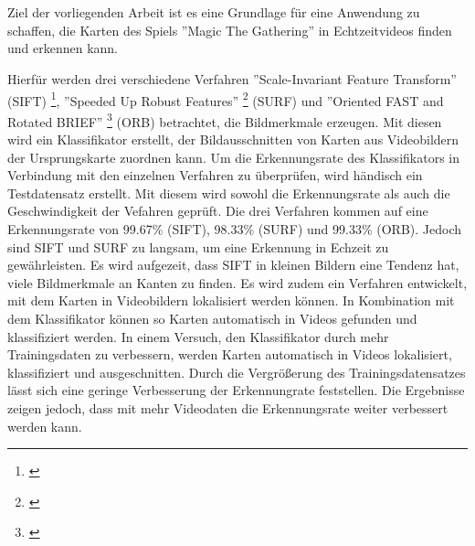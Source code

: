\section*{}
Ziel der vorliegenden Arbeit ist es eine Grundlage für eine Anwendung zu schaffen, die Karten des Spiels ''Magic The Gathering'' in Echtzeitvideos finden und erkennen kann.

Hierfür werden drei verschiedene Verfahren ''Scale-Invariant Feature Transform'' (SIFT) \footnote{\cite{Lowe2004}}, ''Speeded Up Robust Features'' \footnote{\cite{Bay:2008:SRF:1370312.1370556}} (SURF) und ''Oriented FAST and Rotated BRIEF'' \footnote{\cite{Rublee:2011:OEA:2355573.2356268}} (ORB)  betrachtet, die Bildmerkmale erzeugen. Mit diesen wird ein Klassifikator erstellt, der Bildausschnitten von Karten aus Videobildern der Ursprungskarte zuordnen kann.
Um die Erkennungsrate des Klassifikators in Verbindung mit den einzelnen Verfahren zu überprüfen, wird händisch ein Testdatensatz erstellt. Mit diesem wird sowohl die Erkennungsrate als auch die Geschwindigkeit der Vefahren geprüft.
Die drei Verfahren kommen auf eine Erkennungsrate von 99.67\% (SIFT), 98.33\% (SURF) und 99.33\% (ORB).
Jedoch sind SIFT und SURF zu langsam, um eine Erkennung in Echzeit zu gewährleisten.
Es wird aufgezeit, dass SIFT in kleinen Bildern eine Tendenz hat, viele Bildmerkmale an Kanten zu finden.
Es wird zudem ein Verfahren entwickelt, mit dem Karten in Videobildern lokalisiert werden können.  In Kombination mit dem Klassifikator können so Karten automatisch in Videos gefunden und klassifiziert werden.
In einem Versuch, den Klassifikator durch mehr Trainingsdaten zu verbessern, werden Karten automatisch in Videos lokalisiert, klassifiziert und ausgeschnitten. Durch die Vergrößerung des Trainingsdatensatzes lässt sich eine geringe Verbesserung der Erkennungrate feststellen. Die Ergebnisse zeigen jedoch, dass mit mehr Videodaten die Erkennungsrate weiter verbessert werden kann.